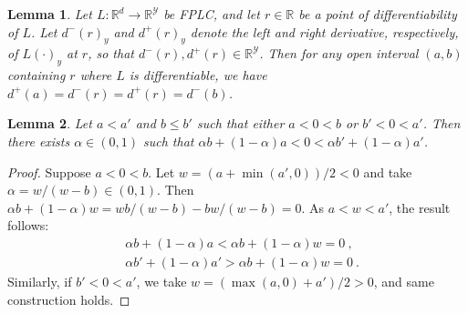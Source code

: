 \documentclass[11pt]{article}
\newcommand{\reals}{\mathbb{R}}
\newcommand{\Y}{\mathcal{Y}}
\newtheorem{lemma}{Lemma}
\begin{document}
\begin{lemma}\label{lem:fplc-directional-deriv}
  Let $L:\reals^d \to \reals^\Y$ be FPLC, and let $r\in\reals$ be a point of differentiability of $L$.
  Let $d^-(r)_y$ and $d^+(r)_y$ denote the left and right derivative, respectively, of $L(\cdot)_y$ at $r$, so that $d^-(r),d^+(r)\in\reals^\Y$.
  Then for any open interval $(a,b)$ containing $r$ where $L$ is differentiable, we have
$d^+(a) = d^-(r) = d^+(r) = d^-(b)$.
\end{lemma}

\begin{lemma}\label{lem:simple-intervals}
  Let $a<a'$ and $b\leq b'$ such that either $a< 0 < b$ or $b' < 0 < a'$.
  Then there exists $\alpha \in (0,1)$ such that $\alpha b + (1-\alpha) a < 0 < \alpha b' + (1-\alpha) a'$.
\end{lemma}
\begin{proof}
  Suppose $a < 0 < b$.
  Let $w = (a + \min(a',0))/2 < 0$ and take $\alpha = w/(w-b) \in (0,1)$.
  Then $\alpha b + (1-\alpha) w = wb/(w-b) - bw/(w-b) = 0$.
  As $a < w < a'$, the result follows:
  \begin{align*}
    & \alpha b + (1-\alpha) a < \alpha b + (1-\alpha) w = 0~,
    \\
    & \alpha b' + (1-\alpha) a' > \alpha b + (1-\alpha) w = 0~.
  \end{align*}
  Similarly, if $b' < 0 < a'$, we take $w = (\max(a,0)+a')/2 > 0$, and same construction holds.
\end{proof}
\end{document}
